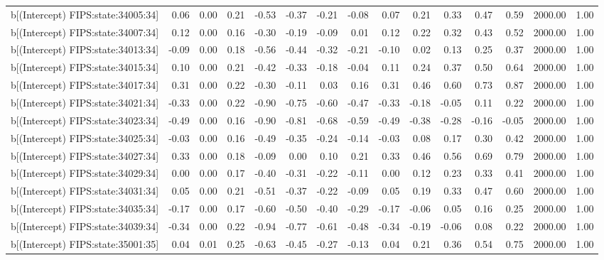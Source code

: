 \begin{table}[ht]
\begin{tabular}{rrrrrrrrrrrrrrr}
  b[(Intercept) FIPS:state:34005:34] & 0.06 & 0.00 & 0.21 & -0.53 & -0.37 & -0.21 & -0.08 & 0.07 & 0.21 & 0.33 & 0.47 & 0.59 & 2000.00 & 1.00 \\ 
  b[(Intercept) FIPS:state:34007:34] & 0.12 & 0.00 & 0.16 & -0.30 & -0.19 & -0.09 & 0.01 & 0.12 & 0.22 & 0.32 & 0.43 & 0.52 & 2000.00 & 1.00 \\ 
  b[(Intercept) FIPS:state:34013:34] & -0.09 & 0.00 & 0.18 & -0.56 & -0.44 & -0.32 & -0.21 & -0.10 & 0.02 & 0.13 & 0.25 & 0.37 & 2000.00 & 1.00 \\ 
  b[(Intercept) FIPS:state:34015:34] & 0.10 & 0.00 & 0.21 & -0.42 & -0.33 & -0.18 & -0.04 & 0.11 & 0.24 & 0.37 & 0.50 & 0.64 & 2000.00 & 1.00 \\ 
  b[(Intercept) FIPS:state:34017:34] & 0.31 & 0.00 & 0.22 & -0.30 & -0.11 & 0.03 & 0.16 & 0.31 & 0.46 & 0.60 & 0.73 & 0.87 & 2000.00 & 1.00 \\ 
  b[(Intercept) FIPS:state:34021:34] & -0.33 & 0.00 & 0.22 & -0.90 & -0.75 & -0.60 & -0.47 & -0.33 & -0.18 & -0.05 & 0.11 & 0.22 & 2000.00 & 1.00 \\ 
  b[(Intercept) FIPS:state:34023:34] & -0.49 & 0.00 & 0.16 & -0.90 & -0.81 & -0.68 & -0.59 & -0.49 & -0.38 & -0.28 & -0.16 & -0.05 & 2000.00 & 1.00 \\ 
  b[(Intercept) FIPS:state:34025:34] & -0.03 & 0.00 & 0.16 & -0.49 & -0.35 & -0.24 & -0.14 & -0.03 & 0.08 & 0.17 & 0.30 & 0.42 & 2000.00 & 1.00 \\ 
  b[(Intercept) FIPS:state:34027:34] & 0.33 & 0.00 & 0.18 & -0.09 & 0.00 & 0.10 & 0.21 & 0.33 & 0.46 & 0.56 & 0.69 & 0.79 & 2000.00 & 1.00 \\ 
  b[(Intercept) FIPS:state:34029:34] & 0.00 & 0.00 & 0.17 & -0.40 & -0.31 & -0.22 & -0.11 & 0.00 & 0.12 & 0.23 & 0.33 & 0.41 & 2000.00 & 1.00 \\ 
  b[(Intercept) FIPS:state:34031:34] & 0.05 & 0.00 & 0.21 & -0.51 & -0.37 & -0.22 & -0.09 & 0.05 & 0.19 & 0.33 & 0.47 & 0.60 & 2000.00 & 1.00 \\ 
  b[(Intercept) FIPS:state:34035:34] & -0.17 & 0.00 & 0.17 & -0.60 & -0.50 & -0.40 & -0.29 & -0.17 & -0.06 & 0.05 & 0.16 & 0.25 & 2000.00 & 1.00 \\ 
  b[(Intercept) FIPS:state:34039:34] & -0.34 & 0.00 & 0.22 & -0.94 & -0.77 & -0.61 & -0.48 & -0.34 & -0.19 & -0.06 & 0.08 & 0.22 & 2000.00 & 1.00 \\ 
  b[(Intercept) FIPS:state:35001:35] & 0.04 & 0.01 & 0.25 & -0.63 & -0.45 & -0.27 & -0.13 & 0.04 & 0.21 & 0.36 & 0.54 & 0.75 & 2000.00 & 1.00 \\ 

\end{tabular}
\end{table}

